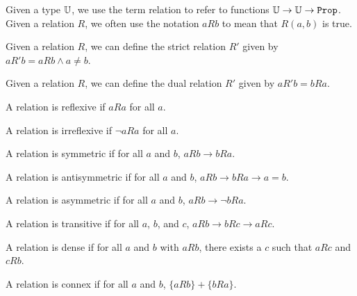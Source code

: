 \documentclass[../math.tex]{subfiles}
\begin{document}
\begin{definition}
    Given a type $\mathbb{U}$, we use the term relation to refer to functions $\U
    \rightarrow \U \rightarrow \vtt{Prop}$.  Given a relation $R$, we often use
    the notation $aRb$ to mean that $R(a, b)$ is true.
\end{definition}

\begin{definition}
    Given a relation $R$, we can define the strict relation $R'$ given by $aR'b
    = aRb \wedge a \neq b$.
\end{definition}

\begin{definition}
    Given a relation $R$, we can define the dual relation $R'$ given by $aR'b =
    bRa$.
\end{definition}

\begin{class}
    A relation is reflexive if $aRa$ for all $a$.
\end{class}

\begin{class}
    A relation is irreflexive if $\neg aRa$ for all $a$.
\end{class}

\begin{class}
    A relation is symmetric if for all $a$ and $b$, $aRb \rightarrow bRa$.
\end{class}

\begin{class}
    A relation is antisymmetric if for all $a$ and $b$, $aRb \rightarrow bRa
    \rightarrow a = b$.
\end{class}

\begin{class}
    A relation is asymmetric if for all $a$ and $b$, $aRb \rightarrow \neg bRa$.
\end{class}

\begin{class}
    A relation is transitive if for all $a$, $b$, and $c$, $aRb \rightarrow bRc
    \rightarrow aRc$.
\end{class}

\begin{class}
    A relation is dense if for all $a$ and $b$ with $aRb$, there exists a $c$
    such that $aRc$ and $cRb$.
\end{class}

\begin{class}
    A relation is connex if for all $a$ and $b$, $\{aRb\} + \{bRa\}$.
\end{class}
\end{document}
